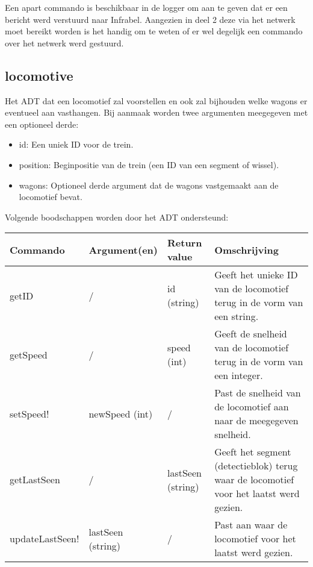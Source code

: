 \documentclass{article}
\begin{document}
\noindent Een apart commando is beschikbaar in de logger om aan te geven dat er een bericht werd verstuurd naar Infrabel. Aangezien in deel 2 deze via het netwerk moet bereikt worden is het handig om te weten of er wel degelijk een commando over het netwerk werd gestuurd.

\newpage
\subsection{locomotive} %
Het ADT dat een locomotief zal voorstellen en ook zal bijhouden welke wagons er eventueel aan vasthangen. Bij aanmaak worden twee argumenten meegegeven met een optioneel derde:
\begin{itemize}
  \item id: Een uniek ID voor de trein.
  \item position: Beginpositie van de trein (een ID van een segment of wissel).
  \item wagons: Optioneel derde argument dat de wagons vastgemaakt aan de locomotief bevat.
\end{itemize}
Volgende boodschappen worden door het ADT ondersteund:
\begin{center}
    \begin{tabular}{ | l | l | l | p{6.5cm} |}
    \hline
    Commando & Argument(en) & Return value & Omschrijving \\ \hline
    getID & / & id (string) & Geeft het unieke ID van de locomotief terug in de vorm van een string. \\ \hline
    getSpeed & / & speed (int) & Geeft de snelheid van de locomotief terug in de vorm van een integer. \\ \hline
    setSpeed! & newSpeed (int) & / & Past de snelheid van de locomotief aan naar de meegegeven snelheid. \\ \hline
    getLastSeen & / & lastSeen (string) & Geeft het segment (detectieblok) terug waar de locomotief voor het laatst werd gezien. \\ \hline
    updateLastSeen! & lastSeen (string) & / & Past aan waar de locomotief voor het laatst werd gezien. \\ \hline
    \end{tabular}
\end{center}
\end{document}
